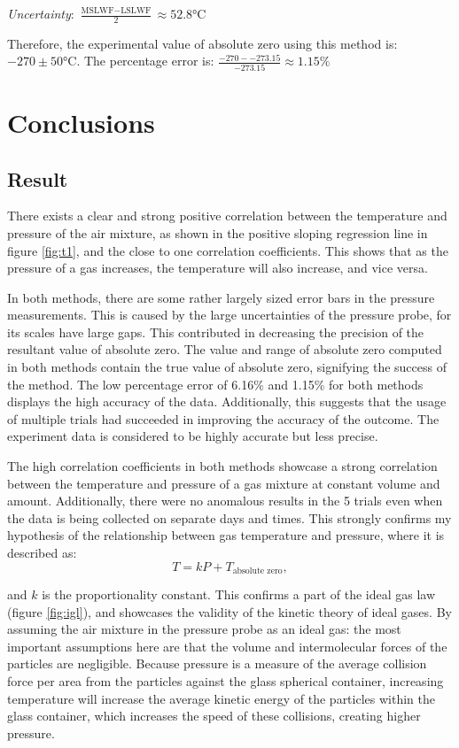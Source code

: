 \documentclass[a4paper,12pt]{article}
\begin{document}
\textit{Uncertainty}: $\frac{\text{MSLWF} - \text{LSLWF}}{2} \approx 52.8 \si{\celsius}$

Therefore, the experimental value of absolute zero using this method is: $-270 \pm 50 \si{\celsius}$. The percentage error is: $\frac{-270 - -273.15}{-273.15} \approx 1.15\%$

\section{Conclusions}
\subsection{Result}
There exists a clear and strong positive correlation between the temperature and pressure of the air mixture, as shown in the positive sloping regression line in figure \ref{fig:t1}, and the close to one correlation coefficients. This shows that as the pressure of a gas increases, the temperature will also increase, and vice versa.

In both methods, there are some rather largely sized error bars in the pressure measurements. This is caused by the large uncertainties of the pressure probe, for its scales have large gaps. This contributed in decreasing the precision of the resultant value of absolute zero.
The value and range of absolute zero computed in both methods contain the true value of absolute zero, signifying the success of the method. The low percentage error of 6.16\% and 1.15\% for both methods displays the high accuracy of the data. Additionally, this suggests that the usage of multiple trials had succeeded in improving the accuracy of the outcome. The experiment data is considered to be highly accurate but less precise.

The high correlation coefficients in both methods showcase a strong correlation between the temperature and pressure of a gas mixture at constant volume and amount. Additionally, there were no anomalous results in the 5 trials even when the data is being collected on separate days and times. This strongly confirms my hypothesis of the relationship between gas temperature and pressure, where it is described as:
\[
    T = kP + T_{\text{absolute zero}},
\]

and $k$ is the proportionality constant. This confirms a part of the ideal gas law (figure \ref{fig:igl}), and showcases the validity of the kinetic theory of ideal gases.
%
By assuming the air mixture in the pressure probe as an ideal gas: the most important assumptions here are that the volume and intermolecular forces of the particles are negligible. Because pressure is a measure of the average collision force per area from the particles against the glass spherical container, increasing temperature will increase the average kinetic energy of the particles within the glass container, which increases the speed of these collisions, creating higher pressure.
\end{document}
